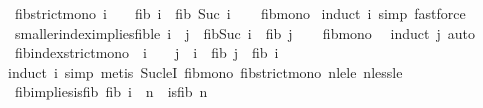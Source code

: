 \begin{isabellebody}
{\isafoldproof}%
%
\isadelimproof
\isanewline
%
\endisadelimproof
\isanewline
{}\isamarkupfalse%
\ fib{\isacharunderscore}{\kern0pt}strict{\isacharunderscore}{\kern0pt}mono{\isacharcolon}{\kern0pt}\ {\isachardoublequoteopen}i\ {\isasymge}\ {}\ {\isasymLongrightarrow}\ fib\ i\ {\isacharless}{\kern0pt}\ fib\ {\isacharparenleft}{\kern0pt}Suc\ i{\isacharparenright}{\kern0pt}{\isachardoublequoteclose}\isanewline
%
\isadelimproof
\ \ %
\endisadelimproof
%
\isatagproof
{}\isamarkupfalse%
\ fib{\isacharunderscore}{\kern0pt}mono\ \isamarkupfalse%
{\isacharparenleft}{\kern0pt}induct\ i{\isacharcomma}{\kern0pt}\ simp{\isacharcomma}{\kern0pt}\ fastforce{\isacharparenright}{\kern0pt}%
\endisatagproof
{\isafoldproof}%
%
\isadelimproof
\isanewline
%
\endisadelimproof
\isanewline
{}\isamarkupfalse%
\ smaller{\isacharunderscore}{\kern0pt}index{\isacharunderscore}{\kern0pt}implies{\isacharunderscore}{\kern0pt}fib{\isacharunderscore}{\kern0pt}le{\isacharcolon}{\kern0pt}\ {\isachardoublequoteopen}i\ {\isacharless}{\kern0pt}\ j\ {\isasymLongrightarrow}\ fib{\isacharparenleft}{\kern0pt}Suc\ i{\isacharparenright}{\kern0pt}\ {\isasymle}\ fib\ j{\isachardoublequoteclose}\isanewline
%
\isadelimproof
\ \ %
\endisadelimproof
%
\isatagproof
{}\isamarkupfalse%
\ fib{\isacharunderscore}{\kern0pt}mono\ \isamarkupfalse%
\ {\isacharparenleft}{\kern0pt}induct\ j{\isacharcomma}{\kern0pt}\ auto{\isacharparenright}{\kern0pt}%
\endisatagproof
{\isafoldproof}%
%
\isadelimproof
\isanewline
%
\endisadelimproof
\isanewline
{}\isamarkupfalse%
\ fib{\isacharunderscore}{\kern0pt}index{\isacharunderscore}{\kern0pt}strict{\isacharunderscore}{\kern0pt}mono\ {\isacharcolon}{\kern0pt}\ {\isachardoublequoteopen}i\ {\isasymge}\ {}\ {\isasymLongrightarrow}\ j\ {\isachargreater}{\kern0pt}\ i\ {\isasymLongrightarrow}\ fib\ j\ {\isachargreater}{\kern0pt}\ fib\ i{\isachardoublequoteclose}\isanewline
%
\isadelimproof
\ \ %
\endisadelimproof
%
\isatagproof
{}\isamarkupfalse%
{\isacharparenleft}{\kern0pt}induct\ i{\isacharcomma}{\kern0pt}\ simp{\isacharcomma}{\kern0pt}\ metis\ Suc{\isacharunderscore}{\kern0pt}leI\ fib{\isacharunderscore}{\kern0pt}mono\ fib{\isacharunderscore}{\kern0pt}strict{\isacharunderscore}{\kern0pt}mono\ nle{\isacharunderscore}{\kern0pt}le\ nless{\isacharunderscore}{\kern0pt}le{\isacharparenright}{\kern0pt}%
\endisatagproof
{\isafoldproof}%
%
\isadelimproof
\isanewline
%
\endisadelimproof
\isanewline
{}\isamarkupfalse%
\ fib{\isacharunderscore}{\kern0pt}implies{\isacharunderscore}{\kern0pt}is{\isacharunderscore}{\kern0pt}fib{\isacharcolon}{\kern0pt}\ {\isachardoublequoteopen}fib\ i\ {\isacharequal}{\kern0pt}\ n\ {\isasymLongrightarrow}\ is{\isacharunderscore}{\kern0pt}fib\ n{\isachardoublequoteclose}\isanewline

\end{isabellebody}
